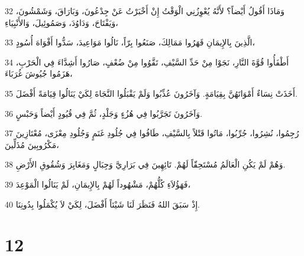 \par 32 وَمَاذَا أَقُولُ أَيْضاً؟ لأَنَّهُ يُعْوِزُنِي الْوَقْتُ إِنْ أَخْبَرْتُ عَنْ جِدْعُونَ، وَبَارَاقَ، وَشَمْشُونَ، وَيَفْتَاحَ، وَدَاوُدَ، وَصَمُوئِيلَ، وَالأَنْبِيَاءِ،
\par 33 الَّذِينَ بِالإِيمَانِ قَهَرُوا مَمَالِكَ، صَنَعُوا بِرّاً، نَالُوا مَوَاعِيدَ، سَدُّوا أَفْوَاهَ أُسُودٍ،
\par 34 أَطْفَأُوا قُوَّةَ النَّارِ، نَجَوْا مِنْ حَدِّ السَّيْفِ، تَقَّوُوا مِنْ ضُعْفٍ، صَارُوا أَشِدَّاءَ فِي الْحَرْبِ، هَزَمُوا جُيُوشَ غُرَبَاءَ،
\par 35 أَخَذَتْ نِسَاءٌ أَمْوَاتَهُنَّ بِقِيَامَةٍ. وَآخَرُونَ عُذِّبُوا وَلَمْ يَقْبَلُوا النَّجَاةَ لِكَيْ يَنَالُوا قِيَامَةً أَفْضَلَ.
\par 36 وَآخَرُونَ تَجَرَّبُوا فِي هُزُءٍ وَجَلْدٍ، ثُمَّ فِي قُيُودٍ أَيْضاً وَحَبْسٍ.
\par 37 رُجِمُوا، نُشِرُوا، جُرِّبُوا، مَاتُوا قَتْلاً بِالسَّيْفِ، طَافُوا فِي جُلُودِ غَنَمٍ وَجُلُودِ مِعْزَى، مُعْتَازِينَ مَكْرُوبِينَ مُذَلِّينَ،
\par 38 وَهُمْ لَمْ يَكُنِ الْعَالَمُ مُسْتَحِقّاً لَهُمْ. تَائِهِينَ فِي بَرَارِيَّ وَجِبَالٍ وَمَغَايِرَ وَشُقُوقِ الأَرْضِ.
\par 39 فَهَؤُلاَءِ كُلُّهُمْ، مَشْهُوداً لَهُمْ بِالإِيمَانِ، لَمْ يَنَالُوا الْمَوْعِدَ،
\par 40 إِذْ سَبَقَ اللهُ فَنَظَرَ لَنَا شَيْئاً أَفْضَلَ، لِكَيْ لاَ يُكْمَلُوا بِدُونِنَا.

\chapter{12}

